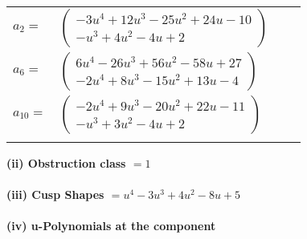 \documentclass[1p]{elsarticle_modified}
\theoremstyle{definition}
\begin{document}
\begin{tabular}{m{7pt} m{180pt} m{7pt} m{180pt} }
\flushright $a_{2}=$&$\begin{pmatrix}-3 u^4+12 u^3-25 u^2+24 u-10\\- u^3+4 u^2-4 u+2\end{pmatrix}$ \\
\flushright $a_{6}=$&$\begin{pmatrix}6 u^4-26 u^3+56 u^2-58 u+27\\-2 u^4+8 u^3-15 u^2+13 u-4\end{pmatrix}$ \\
\flushright $a_{10}=$&$\begin{pmatrix}-2 u^4+9 u^3-20 u^2+22 u-11\\- u^3+3 u^2-4 u+2\end{pmatrix}$\\&\end{tabular}
\flushleft \textbf{(ii) Obstruction class $= 1$}\\~\\
\flushleft \textbf{(iii) Cusp Shapes $= u^4-3 u^3+4 u^2-8 u+5$}\\~\\
\newpage\renewcommand{\arraystretch}{1}
\flushleft \textbf{(iv) u-Polynomials at the component}\newline \\
\end{document}
